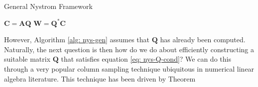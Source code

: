 {\centering
\begin{minipage}{.85\linewidth}
    \begin{algorithm}[H]
        \caption{General Nystrom Framework}
        \label{alg: nys-gen}
        \SetAlgoLined
        \DontPrintSemicolon

        \BlankLine
        $\bm{C} = \bm{A} \bm{Q}$\;
        $\bm{W} = \bm{Q}^{\ast} \bm{C}$\;
        \BlankLine
    \end{algorithm}
\end{minipage}
\par}

However, Algorithm \ref{alg: nys-gen} assumes that $\bm{Q}$ has already been computed. Naturally, the next question is then how do we do about efficiently constructing a suitable matrix $\bm{Q}$ that satisfies equation \ref{eq: nys-Q-cond}? We can do this through a very popular column sampling technique ubiquitous in numerical linear algebra literature. This technique has been driven by Theorem

